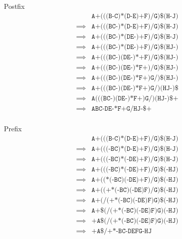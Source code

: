 \documentclass[12pt,letterpaper,final]{report}
\begin{document}
\begin{enumerate}
        Postfix
        \begin{align*}
                   & \texttt{A+(((B-C)*(D-E)+F)/G)\$(H-J)}                           \\
          \implies & \texttt{A+(((}\boxed{\texttt{BC-}}\texttt{)*(D-E)+F)/G)\$(H-J)} \\
          \implies & \texttt{A+(((BC-)*(}\boxed{\texttt{DE-}}\texttt{)+F)/G)\$(H-J)} \\
          \implies & \texttt{A+(((BC-)*(DE-)+F)/G)\$(}\boxed{\texttt{HJ-}}\texttt{)} \\
          \implies & \texttt{A+((}\boxed{\texttt{(BC-)(DE-)*}}\texttt{+F)/G)\$(HJ-)} \\
          \implies & \texttt{A+(((BC-)(DE-)*}\boxed{\texttt{F+}}\texttt{)/G)\$(HJ-)} \\
          \implies & \texttt{A+(((BC-)(DE-)*F+)}\boxed{\texttt{G/}}\texttt{)\$(HJ-)} \\
          \implies & \texttt{A+(((BC-)(DE-)*F+)G/)}\boxed{\texttt{(HJ-)\$}}          \\
          \implies & \boxed{\texttt{A(((BC-)(DE-)*F+)G/)(HJ-)\$+}}                   \\
          \implies & \texttt{ABC-DE-*F+G/HJ-\$+}                                     \\
        \end{align*}

        Prefix
        \begin{align*}
                   & \texttt{A+(((B-C)*(D-E)+F)/G)\$(H-J)}                           \\
          \implies & \texttt{A+(((}\boxed{\texttt{-BC}}\texttt{)*(D-E)+F)/G)\$(H-J)} \\
          \implies & \texttt{A+(((-BC)*(}\boxed{\texttt{-DE}}\texttt{)+F)/G)\$(H-J)} \\
          \implies & \texttt{A+(((-BC)*(-DE)+F)/G)\$(}\boxed{\texttt{-HJ}}\texttt{)} \\
          \implies & \texttt{A+((}\boxed{\texttt{*(-BC)(-DE)}}\texttt{+F)/G)\$(-HJ)} \\
          \implies & \texttt{A+((}\boxed{\texttt{+*(-BC)(-DE)F)}}\texttt{/G)\$(-HJ)} \\
          \implies & \texttt{A+(}\boxed{\texttt{/(+*(-BC)(-DE)F)G}}\texttt{)\$(-HJ)} \\
          \implies & \texttt{A+}\boxed{\texttt{\$(/(+*(-BC)(-DE)F)G)(-HJ)}}          \\
          \implies & \boxed{\texttt{+A}}\texttt{\$(/(+*(-BC)(-DE)F)G)(-HJ)}          \\
          \implies & \texttt{+A\$/+*-BC-DEFG-HJ}                                     \\
        \end{align*}

\end{enumerate}
\end{document}
